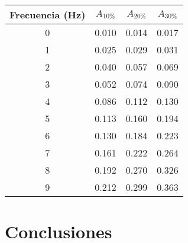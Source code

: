 \begin{table}[H]
    \centering
    \begin{tabular}{cccc}
    \toprule
     Frecuencia (Hz) & $A_{10\%}$ & $A_{20\%}$ & $A_{30\%}$ \\
    \midrule
     0 &       0.010 &       0.014 &       0.017 \\
     1 &       0.025 &       0.029 &       0.031 \\
     2 &       0.040 &       0.057 &       0.069 \\
     3 &       0.052 &       0.074 &       0.090 \\
     4 &       0.086 &       0.112 &       0.130 \\
     5 &       0.113 &       0.160 &       0.194 \\
     6 &       0.130 &       0.184 &       0.223 \\
     7 &       0.161 &       0.222 &       0.264 \\
     8 &       0.192 &       0.270 &       0.326 \\
     9 &       0.212 &       0.299 &       0.363 \\
    \bottomrule
    \end{tabular}
\end{table}


\section{Conclusiones}